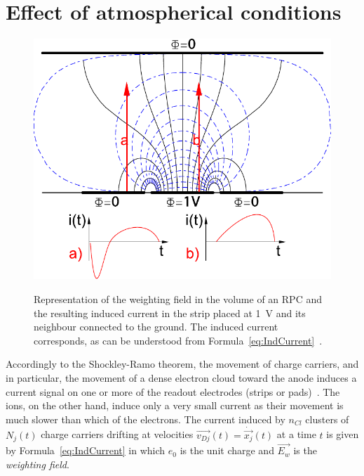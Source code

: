 \section{Effect of atmospherical conditions}
\label{chapt3:sec:PTcorrection}
	
\begingroup\setlength{\intextsep}{0pt}\setlength{\columnsep}{15pt}
	
	\begin{figure}
		\centering
		\includegraphics[width = \linewidth]{fig/chapt3/Weighting_field.pdf}\\
		\caption{\label{fig:weighting-field} Representation of the weighting field in the volume of an RPC and the resulting induced current in the strip placed at \SI{1}{V} and its neighbour connected to the ground. The induced current corresponds, as can be understood from Formula~\ref{eq:IndCurrent}~\cite{LIPPMANN2003}.}
	\end{figure}

	Accordingly to the Shockley-Ramo theorem, the movement of charge carriers, and in particular, the movement of a dense electron cloud toward the anode induces a current signal on one or more of the readout electrodes (strips or pads)~\cite{SHOCKLEY1938,RAMO1939}. The ions, on the other hand, induce only a very small current as their movement is much slower than which of the electrons. The current induced by $n_{Cl}$ clusters of $N_j(t)$ charge carriers drifting at velocities $\overrightarrow{v_{Dj}}(t) = \dot{\overrightarrow{x_j}}(t)$ at a time $t$ is given by Formula~\ref{eq:IndCurrent} in which $e_0$ is the unit charge and $\overrightarrow{E_w}$ is the \textit{weighting field}.
	
